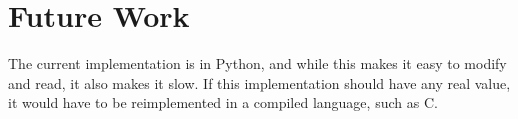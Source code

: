 \documentclass{article}
\begin{document}
\section*{Future Work}
The current implementation is in Python, and while this makes it easy to modify and read, it also makes it slow. If this implementation should have any real value, it would have to be reimplemented in a compiled language, such as C.



\end{document}
